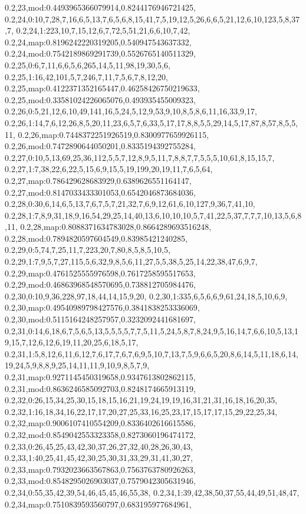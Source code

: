 0.2,23,mod:0.4493965366079914,0.8244176946721425,
0.2,24,0:10,7,28,7,16,6,5,13,7,6,5,6,8,15,41,7,5,19,12,5,26,6,6,5,21,12,6,10,123,5,8,37,7,
0.2,24,1:223,10,7,15,12,6,7,72,5,51,21,6,6,10,7,42,
0.2,24,map:0.8196242220319205,0.540947543637332,
0.2,24,mod:0.7542189869291739,0.5526765140511329,
0.2,25,0:6,7,11,6,6,5,6,265,14,5,11,98,19,30,5,6,
0.2,25,1:16,42,101,5,7,246,7,11,7,5,6,7,8,12,20,
0.2,25,map:0.4122371352165447,0.46258426750219633,
0.2,25,mod:0.33581024226065076,0.493935455009323,
0.2,26,0:5,21,12,6,10,49,141,16,5,24,5,12,9,53,9,10,8,5,8,6,11,16,33,9,17,
0.2,26,1:14,7,6,12,26,8,5,20,11,23,6,5,7,6,33,5,17,17,8,8,5,5,29,14,5,17,87,8,57,8,5,5,11,
0.2,26,map:0.7448372251926519,0.8300977659926115,
0.2,26,mod:0.7472890644050201,0.8335194392755284,
0.2,27,0:10,5,13,69,25,36,112,5,5,7,12,8,9,5,11,7,8,8,7,7,5,5,5,10,61,8,15,15,7,
0.2,27,1:7,38,22,6,22,5,15,6,9,15,5,19,199,20,19,11,7,6,5,64,
0.2,27,map:0.786429628683929,0.6389626551164147,
0.2,27,mod:0.8147033433301053,0.6542046873684036,
0.2,28,0:30,6,14,6,5,13,7,6,7,5,7,21,32,7,6,9,12,61,6,10,127,9,36,7,41,10,
0.2,28,1:7,8,9,31,18,9,16,54,29,25,14,40,13,6,10,10,10,5,7,41,22,5,37,7,7,7,10,13,5,6,8,11,
0.2,28,map:0.8088371634783028,0.8664289693516248,
0.2,28,mod:0.7894820597604549,0.83985421240285,
0.2,29,0:5,74,7,25,11,7,223,20,7,80,8,5,8,5,10,5,
0.2,29,1:7,9,5,7,27,115,5,6,32,9,8,5,6,11,27,5,5,38,5,25,14,22,38,47,6,9,7,
0.2,29,map:0.4761525555976598,0.7617258595517653,
0.2,29,mod:0.46863968548570695,0.738812705984476,
0.2,30,0:10,9,36,228,97,18,44,14,15,9,20,
0.2,30,1:335,6,5,6,6,9,61,24,18,5,10,6,9,
0.2,30,map:0.49540989798427576,0.3841838253336069,
0.2,30,mod:0.5115164248257957,0.3232092441681697,
0.2,31,0:14,6,18,6,7,5,6,5,13,5,5,5,5,7,7,5,11,5,24,5,8,7,8,24,9,5,16,14,7,6,6,10,5,13,19,15,7,12,6,12,6,19,11,20,25,6,18,5,17,
0.2,31,1:5,8,12,6,11,6,12,7,6,17,7,6,7,6,9,5,10,7,13,7,5,9,6,6,5,20,8,6,14,5,11,18,6,14,19,24,5,9,8,8,9,25,14,11,11,9,10,9,8,5,7,9,
0.2,31,map:0.9271145450319658,0.9347613802862115,
0.2,31,mod:0.8636246585092703,0.8248174665913119,
0.2,32,0:26,15,34,25,30,15,18,15,16,21,19,24,19,19,16,31,21,31,16,18,16,20,35,
0.2,32,1:16,18,34,16,22,17,17,20,27,25,33,16,25,23,17,15,17,17,15,29,22,25,34,
0.2,32,map:0.9006107410554209,0.8336402616615586,
0.2,32,mod:0.8549042553323358,0.8273060196474172,
0.2,33,0:26,45,25,43,42,30,37,26,27,32,40,28,26,30,43,
0.2,33,1:40,25,41,45,42,30,25,30,31,33,29,31,41,30,27,
0.2,33,map:0.7932023663567863,0.7563763780926263,
0.2,33,mod:0.8548295026903037,0.7579042305631946,
0.2,34,0:55,35,42,39,54,46,45,45,46,55,38,
0.2,34,1:39,42,38,50,37,55,44,49,51,48,47,
0.2,34,map:0.7510839593560797,0.683195977684961,
